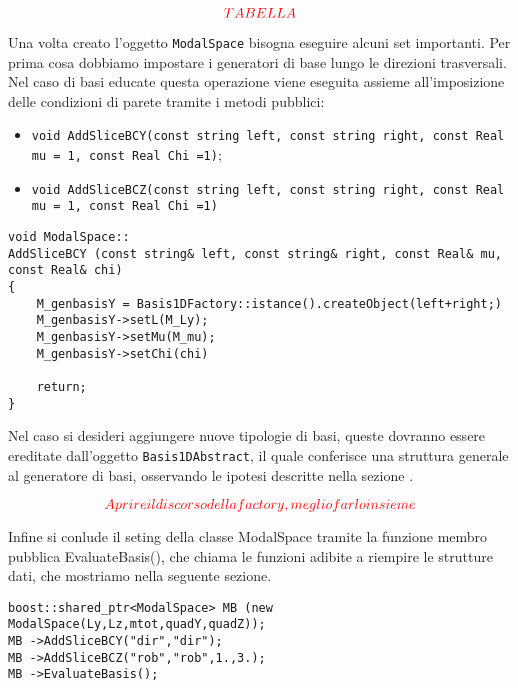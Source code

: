 \begin{equation}
\textcolor{red}{TABELLA}
\end{equation}

Una volta creato l'oggetto \texttt{ModalSpace} bisogna eseguire alcuni set importanti. Per prima cosa dobbiamo impostare i generatori di base lungo le direzioni trasversali. Nel caso di basi educate questa operazione viene eseguita assieme all'imposizione delle condizioni di parete tramite i metodi pubblici:
\begin{itemize}
\item \texttt{void AddSliceBCY(const string left, const string right, const Real mu = 1, const Real Chi =1)};
\item \texttt{void AddSliceBCZ(const string left, const string right, const Real mu = 1, const Real Chi =1)}
\end{itemize}

\begin{lstlisting}[style = general]
void ModalSpace::
AddSliceBCY (const string& left, const string& right, const Real& mu, const Real& chi)
{
	M_genbasisY = Basis1DFactory::istance().createObject(left+right;)
	M_genbasisY->setL(M_Ly);
	M_genbasisY->setMu(M_mu);
	M_genbasisY->setChi(chi)
	
	return;
}
\end{lstlisting}
 Nel caso si desideri aggiungere nuove tipologie di basi, queste dovranno essere ereditate dall'oggetto \texttt{Basis1DAbstract}, il quale conferisce una struttura generale al generatore di basi, osservando le ipotesi descritte nella sezione .
 
 \begin{equation}
\textcolor{red}{Aprire il discorso della factory, meglio farlo insieme} 
 \end{equation}

Infine si conlude il seting della classe ModalSpace tramite la funzione membro pubblica EvaluateBasis(), che chiama le funzioni adibite a riempire le strutture dati, che mostriamo nella seguente sezione.

\begin{lstlisting}[style = general]
boost::shared_ptr<ModalSpace> MB (new ModalSpace(Ly,Lz,mtot,quadY,quadZ));
MB ->AddSliceBCY("dir","dir");
MB ->AddSliceBCZ("rob","rob",1.,3.);
MB ->EvaluateBasis();
\end{lstlisting}

